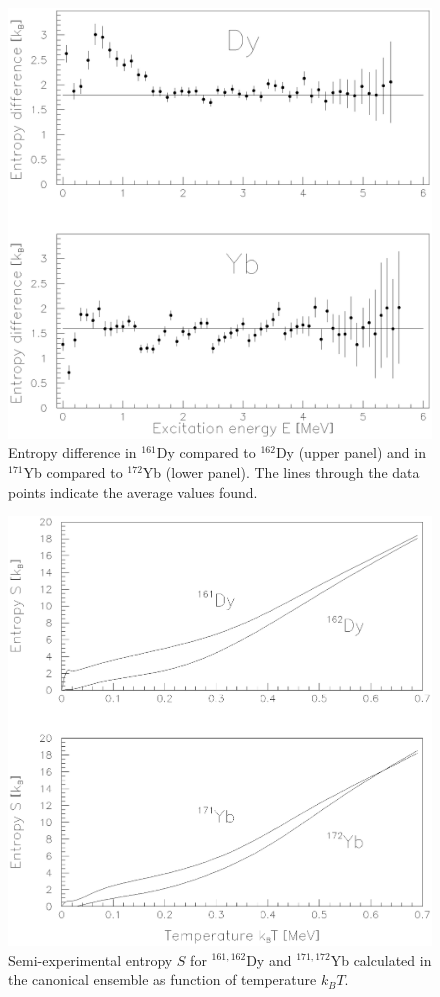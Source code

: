 \begin{figure}
\includegraphics[totalheight=17.5cm,angle=0,bb=0 80 350 730]{fig9.ps}
\caption{Entropy difference in $^{161}$Dy compared to $^{162}$Dy (upper panel) and in $^{171}$Yb compared to $^{172}$Yb (lower panel). The lines through the data points indicate the average values found.}
\label{fig:fig9}
\end{figure}

\begin{figure}
\includegraphics[totalheight=17.5cm,angle=0,bb=0 80 350 730]{fig10.ps}
\caption{Semi-experimental entropy $S$ for $^{161,162}$Dy and $^{171,172}$Yb calculated in the canonical ensemble as function of temperature $k_BT$.}
\label{fig:fig10}
\end{figure}


